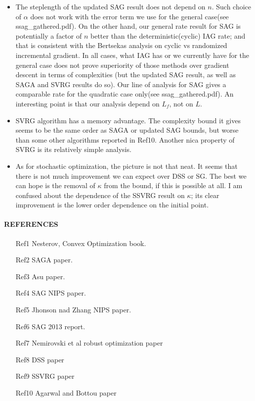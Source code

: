 \documentclass{article}
\begin{document}
  \begin{itemize}
   \item The steplength of the updated SAG result does not depend on $n$.  Such choice of $\alpha$ does not work with the error term we use for the general case(see ssag\_gathered.pdf).  On the other hand, our general rate result for SAG is potentially a factor of $n$ better than the deterministic(cyclic) IAG rate; and that is consistent with the Bertsekas analysis on cyclic vs randomized incremental gradient.  In all cases, what IAG has or we currently have for the general case does not prove superiority of those methods over gradient descent in terms of complexities (but the updated SAG result, as well as SAGA and SVRG results do so).  Our line of analysis for SAG gives a comparable rate for the quadratic case only(see ssag\_gathered.pdf).  An interesting point is that our analysis depend on $L_f$, not on $L$.
   
   \item SVRG algorithm has a memory advantage.  The complexity bound it gives seems to be the same order as SAGA or updated SAG bounds, but worse than some other algorithms reported in Ref10.  Another nica property of SVRG is its relatively simple analysis.   
   
   \item As for stochastic optimization, the picture is not that neat.  It seems that there is not much improvement we can expect over DSS or SG.  The best we can hope is the removal of $\kappa$ from the bound, if this is possible at all.  I am confused about the dependence of the SSVRG result on $\kappa$; its clear improvement is the lower order dependence on the initial point.
   
  \end{itemize}

  
 \bigskip\bigskip

 \paragraph{REFERENCES}
 \begin{itemize}
 \item[Ref1] Nesterov, Convex Optimization book.
 \item[Ref2] SAGA paper. 
 \item[Ref3] Asu paper. 
 \item[Ref4] SAG NIPS paper. 
 \item[Ref5] Jhonson nad Zhang NIPS paper.
 \item[Ref6] SAG 2013 report.
 \item[Ref7] Nemirovski et al robust optimization paper
 \item[Ref8] DSS paper
 \item[Ref9] SSVRG paper
 \item[Ref10] Agarwal and Bottou paper
\end{itemize}
 
 
\end{document}

